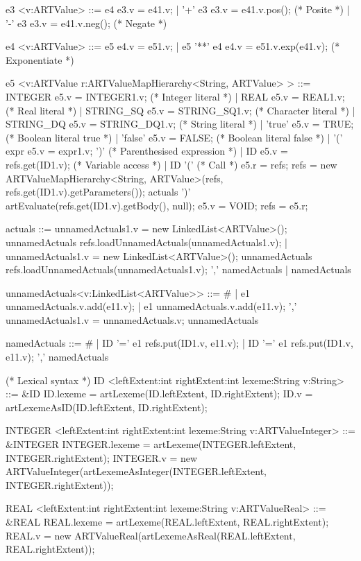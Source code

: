 \begin{codeblock}
e3 <v:ARTValue> ::= 
  e4 {e3.v = e41.v; }   
  | '+' e3 {e3.v = e41.v.pos(); }      (* Posite *)
  | '-' e3 {e3.v = e41.v.neg(); }      (* Negate *)

e4 <v:ARTValue> ::= 
  e5 { e4.v = e51.v; }  
  | e5 '**' e4 { e4.v = e51.v.exp(e41.v); }      (* Exponentiate *)

e5 <v:ARTValue r:ARTValueMapHierarchy<String, ARTValue> > ::= 
  INTEGER {e5.v = INTEGER1.v; }      (* Integer literal *)
  | REAL {e5.v = REAL1.v; }            (* Real literal *)
  | STRING_SQ {e5.v = STRING_SQ1.v; }  (* Character literal *)
  | STRING_DQ {e5.v = STRING_DQ1.v; }  (* String literal *)
  | 'true' {e5.v = TRUE;}    (* Boolean literal true *) 
  | 'false' {e5.v = FALSE;}            (* Boolean literal false *)
  | '(' expr { e5.v = expr1.v; } ')'   (* Parenthesised expression *)
  | ID { e5.v = refs.get(ID1.v); }     (* Variable access *)
  | ID '('            (* Call *) 
  { e5.r = refs; 
  refs = new ARTValueMapHierarchy<String, ARTValue>(refs, refs.get(ID1.v).getParameters()); } 
  actuals ')' { artEvaluate(refs.get(ID1.v).getBody(), null); e5.v = VOID; refs = e5.r; }

actuals ::= 
  { unnamedActuals1.v = new LinkedList<ARTValue>(); } 
  unnamedActuals { refs.loadUnnamedActuals(unnamedActuals1.v); }
  | { unnamedActuals1.v = new LinkedList<ARTValue>(); } 
  unnamedActuals { refs.loadUnnamedActuals(unnamedActuals1.v); }  ',' namedActuals 
  |  namedActuals

unnamedActuals<v:LinkedList<ARTValue>> ::= 
  # 
  | e1 { unnamedActuals.v.add(e11.v); } 
  | e1 { unnamedActuals.v.add(e11.v); } ',' 
  { unnamedActuals1.v = unnamedActuals.v; } unnamedActuals

namedActuals ::= 
  # 
  | ID '=' e1 { refs.put(ID1.v, e11.v); } 
  | ID '=' e1 { refs.put(ID1.v, e11.v); } ',' namedActuals

(* Lexical syntax *)
ID <leftExtent:int rightExtent:int lexeme:String v:String> ::= 
  &ID {ID.lexeme = artLexeme(ID.leftExtent, ID.rightExtent); 
  ID.v = artLexemeAsID(ID.leftExtent, ID.rightExtent); }  

INTEGER <leftExtent:int rightExtent:int lexeme:String v:ARTValueInteger> ::= 
  &INTEGER 
  { INTEGER.lexeme = artLexeme(INTEGER.leftExtent, INTEGER.rightExtent); 
  INTEGER.v = new ARTValueInteger(artLexemeAsInteger(INTEGER.leftExtent, INTEGER.rightExtent)); }  

REAL <leftExtent:int rightExtent:int lexeme:String v:ARTValueReal> ::= 
  &REAL 
  { REAL.lexeme = artLexeme(REAL.leftExtent, REAL.rightExtent); 
  REAL.v = new ARTValueReal(artLexemeAsReal(REAL.leftExtent, REAL.rightExtent)); }  


\end{codeblock}
